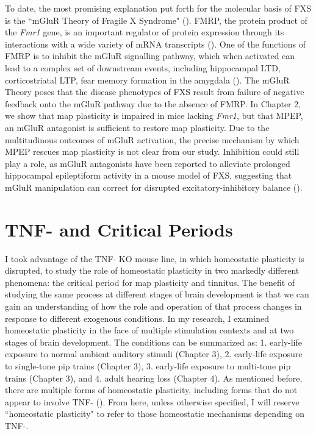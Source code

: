 To date, the most promising explanation put forth for the molecular basis of FXS is the ``mGluR Theory of Fragile X Syndrome" (\cite{Bear2004}). FMRP, the protein product of the \textit{Fmr1} gene, is an important regulator of protein expression through its interactions with a wide variety of mRNA transcripts (\cite{Brown2001}). One of the functions of FMRP is to inhibit the mGluR signalling pathway, which when activated can lead to a complex set of downstream events, including hippocampal LTD, corticostriatal LTP, fear memory formation in the amygdala (\cite{Oliet1997, Gubellini2003, Rodrigues2002}). The mGluR Theory poses that the disease phenotypes of FXS result from failure of negative feedback onto the mGluR pathway due to the absence of FMRP. In Chapter 2, we show that map plasticity is impaired in mice lacking \textit{Fmr1}, but that MPEP, an mGluR antagonist is sufficient to restore map plasticity. Due to the multitudinous outcomes of mGluR activation, the precise mechanism by which MPEP rescues map plasticity is not clear from our study. Inhibition could still play a role, as mGluR antagonists have been reported to alleviate prolonged hippocampal epileptiform activity in a mouse model of FXS, suggesting that mGluR manipulation can correct for disrupted excitatory-inhibitory balance (\cite{Chuang2005}).

\section{TNF-\textalpha{} and Critical Periods}

I took advantage of the TNF-\textalpha{} KO mouse line, in which homeostatic plasticity is disrupted, to study the role of homeostatic plasticity in two markedly different phenomena: the critical period for map plasticity and tinnitus.
The benefit of studying the same process at different stages of brain development is that we can gain an understanding of how the role and operation of that process changes in response to different exogenous conditions. In my research, I examined homeostatic plasticity in the face of multiple stimulation contexts and at two stages of brain development. The conditions can be summarized as: 1. early-life exposure to normal ambient auditory stimuli (Chapter 3), 2. early-life exposure to single-tone pip trains (Chapter 3), 3. early-life exposure to multi-tone pip trains (Chapter 3), and 4. adult hearing loss (Chapter 4). As mentioned before, there are multiple forms of homeostatic plasticity, including forms that do not appear to involve TNF-\textalpha{} (\cite{Stellwagen2006}). From here, unless otherwise specified, I will reserve ``homeostatic plasticity" to refer to those homeostatic mechanisms depending on TNF-\textalpha{}.

